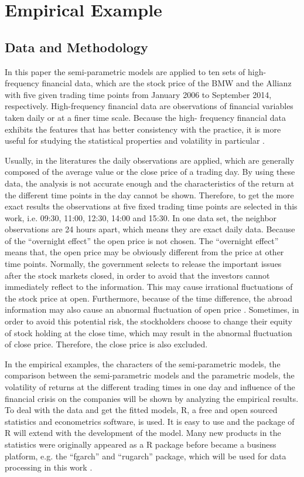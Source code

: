 \chapter{Empirical Example}


\section{Data and Methodology}

In this paper the semi-parametric models are applied to ten sets of high-frequency financial data, which are the stock price of the BMW and the Allianz with five given trading time points from January 2006 to September 2014, respectively. High-frequency financial data are observations of financial variables taken daily or at a finer time scale. Because the high- frequency financial data exhibits the features that has better consistency with the practice, it is more useful for studying the statistical properties and volatility in particular \citep{Zivot2005}.

Usually, in the literatures the daily observations are applied, which are generally composed of the average value or the close price of a trading day. By using these data, the analysis is not accurate enough and the characteristics of the return at the different time points in the day cannot be shown. Therefore, to get the more exact results the observations at five fixed trading time points are selected in this work, i.e. 09:30, 11:00, 12:30, 14:00 and 15:30. In one data set, the neighbor observations are 24 hours apart, which means they are exact daily data. Because of the ``overnight effect'' the open price is not chosen. The ``overnight effect'' means that, the open price may be obviously different from the price at other time points. Normally, the government selects to release the important issues after the stock markets closed, in order to avoid that the investors cannot immediately reflect to the information. This may cause irrational fluctuations of the stock price at open. Furthermore, because of the time difference, the abroad information may also cause an abnormal fluctuation of open price \citep{Tsai2012}. Sometimes, in order to avoid this potential risk, the stockholders choose to change their equity of stock holding at the close time, which may result in the abnormal fluctuation of close price. Therefore, the close price is also excluded.  

In the empirical examples, the characters of the semi-parametric models, the comparison between the semi-parametric models and the parametric models, the volatility of returns at the different trading times in one day and influence of the financial crisis on the companies will be shown by analyzing the empirical results. To deal with the data and get the fitted models, R, a free and open sourced statistics and econometrics software, is used. It is easy to use and the package of R will extend with the development of the model. Many new products in the statistics were originally appeared as a R package before became a business platform, e.g. the ``fgarch'' and ``rugarch'' package, which will be used for data processing in this work \citep{Consulting2013}.


